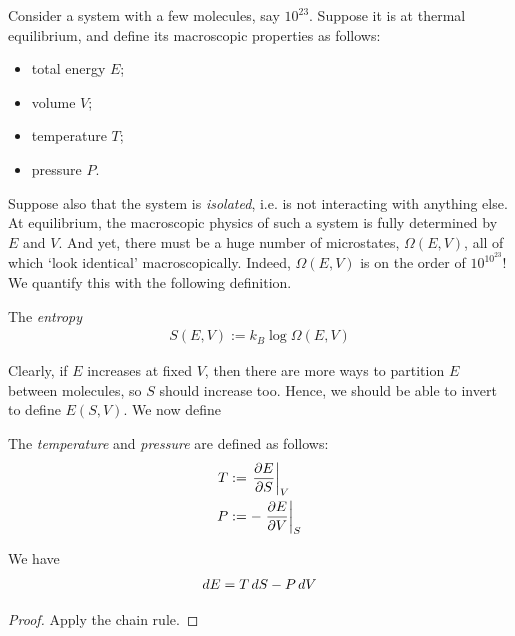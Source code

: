 \documentclass{../../template/note}
\begin{document}
    Consider a system with a few molecules, say $10^{23}$. Suppose it is at thermal equilibrium, and define its macroscopic properties as follows:
    \begin{itemize}
        \item total energy $E$;
        \item volume $V$;
        \item temperature $T$;
        \item pressure $P$.
    \end{itemize}
    Suppose also that the system is \emph{isolated}, i.e. is not interacting with anything else. At equilibrium, the macroscopic physics of such a system is fully determined by $E$ and $V$. And yet, there must be a huge number of microstates, $\Omega(E, V)$, all of which `look identical' macroscopically. Indeed, $\Omega(E, V)$ is on the order of $10^{10^{23}}$! We quantify this with the following definition.

    \begin{definition}[Entropy]
        The \emph{entropy}
        \begin{align*}
            S(E, V) := k_B \log \Omega(E, V)
        \end{align*}
    \end{definition}
    
    Clearly, if $E$ increases at fixed $V$, then there are more ways to partition $E$ between molecules, so $S$ should increase too. Hence, we should be able to invert to define $E(S, V)$. We now define

    \begin{definition}
        \label{temp-pressure}
        The \emph{temperature} and \emph{pressure} are defined as follows:
        \begin{align*}
            T &:= \pd[V]{E}{S} \\
            P &:= -\pd[S]{E}{V}
        \end{align*}
    \end{definition}
    
    \begin{proposition}
        We have
        \begin{align*}
            dE = T \,d{S} - P \,d{V}
        \end{align*}        
    \end{proposition}
    
    \begin{proof}
        Apply the chain rule.
    \end{proof}
    
\end{document}
